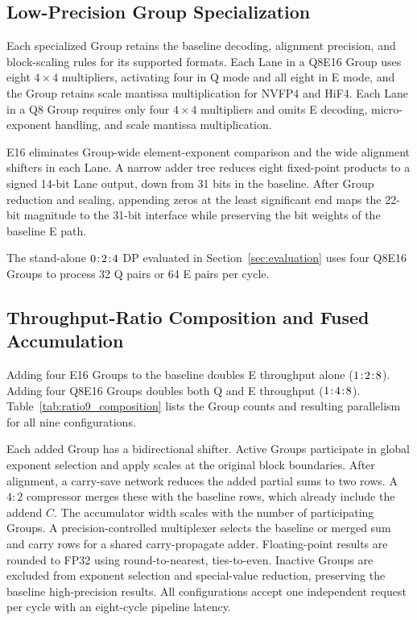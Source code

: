 \documentclass[conference,10pt,letterpaper]{IEEEtran}
\DeclareRobustCommand{\tpratio}[3]{\ensuremath{#1\mkern2mu{:}\mkern2mu#2\mkern2mu{:}\mkern2mu#3}}
\begin{document}
\subsection{Low-Precision Group Specialization}
\label{sec:specialized_midgroups}

Each specialized Group retains the baseline decoding, alignment precision, and block-scaling rules for its supported formats. Each Lane in a Q8E16 Group uses eight $4\times4$ multipliers, activating four in Q mode and all eight in E mode, and the Group retains scale mantissa multiplication for NVFP4 and HiF4. Each Lane in a Q8 Group requires only four $4\times4$ multipliers and omits E decoding, micro-exponent handling, and scale mantissa multiplication.

E16 eliminates Group-wide element-exponent comparison and the wide alignment shifters in each Lane. A narrow adder tree reduces eight fixed-point products to a signed 14-bit Lane output, down from 31 bits in the baseline. After Group reduction and scaling, appending zeros at the least significant end maps the 22-bit magnitude to the 31-bit interface while preserving the bit weights of the baseline E path.

The stand-alone \tpratio{0}{2}{4} DP evaluated in Section~\ref{sec:evaluation} uses four Q8E16 Groups to process 32 Q pairs or 64 E pairs per cycle.

\subsection{Throughput-Ratio Composition and Fused Accumulation}
\label{sec:expansion}

Adding four E16 Groups to the baseline doubles E throughput alone (\tpratio{1}{2}{8}). Adding four Q8E16 Groups doubles both Q and E throughput (\tpratio{1}{4}{8}). Table~\ref{tab:ratio9_composition} lists the Group counts and resulting parallelism for all nine configurations.




Each added Group has a bidirectional shifter. Active Groups participate in global exponent selection and apply scales at the original block boundaries. After alignment, a carry-save network reduces the added partial sums to two rows. A $4:2$ compressor merges these with the baseline rows, which already include the addend $C$. The accumulator width scales with the number of participating Groups. A precision-controlled multiplexer selects the baseline or merged sum and carry rows for a shared carry-propagate adder. Floating-point results are rounded to FP32 using round-to-nearest, ties-to-even. Inactive Groups are excluded from exponent selection and special-value reduction, preserving the baseline high-precision results. All configurations accept one independent request per cycle with an eight-cycle pipeline latency.
\end{document}
